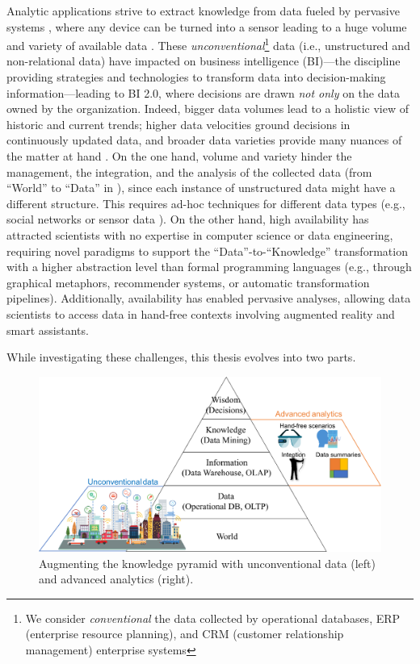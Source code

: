Analytic applications strive to extract knowledge from data fueled by pervasive systems \cite{8423172}, where any device can be turned into a sensor leading to a huge volume and variety of available data \cite{vitali2021crop}. These \textit{unconventional}\footnote{We consider \textit{conventional} the data collected by operational databases, ERP (enterprise resource planning), and CRM (customer relationship management) enterprise systems} data (i.e., unstructured and non-relational data) have impacted on business intelligence (BI)---the discipline providing strategies and technologies to transform data into decision-making information---leading to BI 2.0, where decisions are drawn \textit{not only} on the data owned by the organization. Indeed, bigger data volumes lead to a holistic view of historic and current trends; higher data velocities ground decisions in continuously updated data, and broader data varieties provide many nuances of the matter at hand \cite{IBM4V}. On the one hand, volume and variety hinder the management, the integration, and the analysis of the collected data (from ``World'' to ``Data'' in ), since each instance of unstructured data might have a different structure. This requires ad-hoc techniques for different data types (e.g., social networks \cite{DBLP:journals/snam/FranciaGG19} or sensor data \cite{DBLP:conf/mipro/FranciaGV19}). On the other hand, high availability has attracted scientists with no expertise in computer science or data engineering, requiring novel paradigms to support the ``Data''-to-``Knowledge''
transformation with a higher abstraction level than formal programming languages (e.g., through graphical metaphors, recommender systems, or automatic transformation pipelines). Additionally, availability has enabled pervasive analyses, allowing data scientists to access data in hand-free contexts involving augmented reality and smart assistants.

While investigating these challenges, this thesis evolves into two parts.

\begin{figure}[t]
    \centering
    \includegraphics[scale=.65]{global/augmenting.pdf}
    \caption{Augmenting the knowledge pyramid with unconventional data (left) and advanced analytics (right).}
    \label{fig:aug}
\end{figure}

